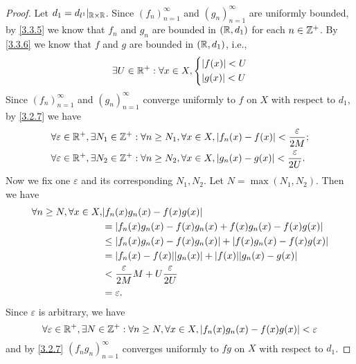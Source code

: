 \begin{proof}
  Let \(d_1 = d_{l^1}|_{\mathbb{R} \times \mathbb{R}}\).
  Since \((f_n)_{n = 1}^\infty\) and \((g_n)_{n = 1}^\infty\) are uniformly bounded, by \cref{3.3.5} we know that \(f_n\) and \(g_n\) are bounded in \((\mathbb{R}, d_1)\) for each \(n \in \mathbb{Z}^+\).
  By \cref{3.3.6} we know that \(f\) and \(g\) are bounded in \((\mathbb{R}, d_1)\), i.e.,
  \[
    \exists U \in \mathbb{R}^+ : \forall x \in X, \begin{dcases}
      \left\lvert f(x)\right\rvert < U \\
      \left\lvert g(x)\right\rvert < U
    \end{dcases}
  \]
  Since \((f_n)_{n = 1}^\infty\) and \((g_n)_{n = 1}^\infty\) converge uniformly to \(f\) on \(X\) with respect to \(d_1\), by \cref{3.2.7} we have
  \begin{align*}
     & \forall \varepsilon \in \mathbb{R}^+, \exists N_1 \in \mathbb{Z}^+ : \forall n \geq N_1, \forall x \in X, \left\lvert f_n(x) - f(x)\right\rvert < \dfrac{\varepsilon}{2M}; \\
     & \forall \varepsilon \in \mathbb{R}^+, \exists N_2 \in \mathbb{Z}^+ : \forall n \geq N_2, \forall x \in X, \left\lvert g_n(x) - g(x)\right\rvert < \dfrac{\varepsilon}{2U}.
  \end{align*}
  Now we fix one \(\varepsilon\) and its corresponding \(N_1, N_2\).
  Let \(N = \max(N_1, N_2)\).
  Then we have
  \begin{align*}
    \forall n \geq N, \forall x \in X, & \abs{f_n(x) g_n(x) - f(x) g(x)}                                        \\
                                       & = \abs{f_n(x) g_n(x) - f(x) g_n(x) + f(x) g_n(x) - f(x) g(x)}          \\
                                       & \leq \abs{f_n(x) g_n(x) - f(x) g_n(x)} + \abs{f(x) g_n(x) - f(x) g(x)} \\
                                       & = \abs{f_n(x) - f(x)} \abs{g_n(x)} + \abs{f(x)} \abs{g_n(x) - g(x)}    \\
                                       & < \dfrac{\varepsilon}{2M} M + U \dfrac{\varepsilon}{2U}                \\
                                       & = \varepsilon.
  \end{align*}
  Since \(\varepsilon\) is arbitrary, we have
  \[
    \forall \varepsilon \in \mathbb{R}^+, \exists N \in \mathbb{Z}^+ : \forall n \geq N, \forall x \in X, \left\lvert f_n(x) g_n(x) - f(x) g(x)\right\rvert < \varepsilon
  \]
  and by \cref{3.2.7} \((f_n g_n)_{n = 1}^\infty\) converges uniformly to \(fg\) on \(X\) with respect to \(d_1\).
\end{proof}